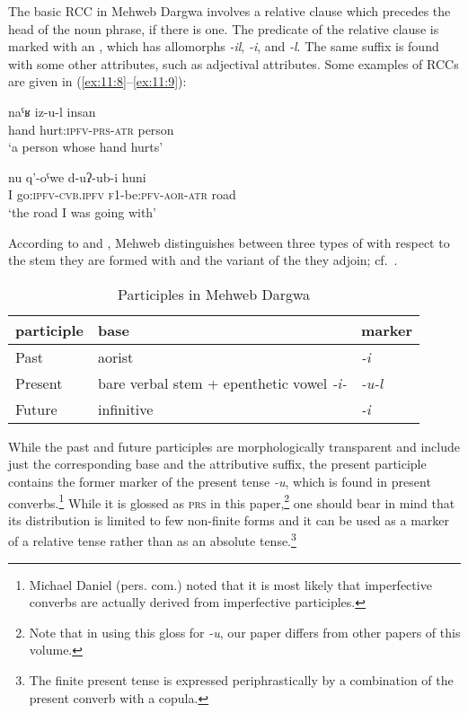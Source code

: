 ﻿\documentclass[output=paper]{langsci/langscibook}
\begin{document}
The basic RCC in Mehweb Dargwa involves a relative clause which precedes
the head of the noun phrase, if there is one. The predicate of the
relative clause is marked with an , which has
allomorphs \emph{-il}, \emph{-i}, and \emph{-l}. The same
suffix is
found with some other attributes, such as adjectival attributes. Some
examples of RCCs are given in (\ref{ex:11:8}–\ref{ex:11:9}):

\ea \label{ex:11:8} %
\gll   naˤʁ iz-u-l insan\\
 hand hurt:\textsc{ipfv}-\textsc{prs}-\textsc{atr} person\\
\glt   `a person whose hand hurts'

\ex \label{ex:11:9} %
\gll  nu q'-oˤwe d-uʔ-ub-i huni\\
 I go:\textsc{ipfv}-\textsc{cvb.ipfv}  \textsc{f1}-be:\textsc{pfv}-\textsc{aor}-\textsc{atr} road\\
\glt  `the road I was going with'
\z

According to \citet[112–115]{magometov1982} and \citet[105–107]{khajdakov1985},
Mehweb distinguishes between three types of  with respect to
the stem they are formed with and the variant of the 
they adjoin; cf.\ .

\begin{table}[h]
  \caption{Participles in Mehweb Dargwa}\label{tab:11:1}

\begin{tabular}{@{}lll@{}}
\toprule
{participle} & {base} & {marker}\tabularnewline \midrule
Past & aorist & \emph{-i}\tabularnewline
Present & bare verbal stem + epenthetic vowel \emph{-i-} &
\emph{-u-l}\tabularnewline
Future & infinitive & \emph{-i}\tabularnewline
\bottomrule
\end{tabular}
\end{table}

While the past and future participles are morphologically transparent
and include just the corresponding base and the attributive suffix, the
present participle contains the former marker of the present tense
\emph{-u}, which is found in present converbs.\footnote{Michael Daniel
  (pers. com.) noted that it is most likely that imperfective converbs
  are actually derived from imperfective participles.} While it is
glossed as \textsc{prs} in this paper,\footnote{Note that in using this
  gloss for \emph{-u}, our paper differs from other papers of this
  volume.} one should bear in mind that its distribution is limited to
few non-finite forms and it can be used as a marker of a relative tense
rather than as an absolute tense.\footnote{The finite present tense is
  expressed periphrastically by a combination of the present converb
  with a copula.}
\end{document}
